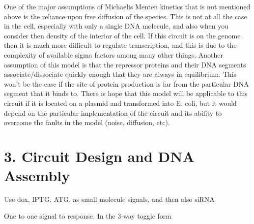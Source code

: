 \documentclass[11pt]{article}
\begin{document}
\begin{itemize}
One of the major assumptions of Michaelis Menten kinetics that is not mentioned above is the reliance upon free diffusion of the species. This is not at all the case in the cell, especially with only a single DNA molecule, and also when you consider then density of the interior of the cell.  If this circuit is on the genome then it is much more difficult to regulate transcription, and this is due to the complexity of available sigma factors among many other things. Another assumption of this model is that the repressor proteins and their DNA segments associate/dissociate quickly enough that they are always in equilibrium. This won't be the case if the site of protein production is far from the particular DNA segment that it binds to. There is hope that this model will be applicable to this circuit if it is located on a plasmid and transformed into E. coli, but it would depend on the particular implementation of the circuit and its ability to overcome the faults in the model (noise, diffusion, etc). 
\end{itemize}


\section*{3. Circuit Design and DNA Assembly}

Use dox, IPTG, ATG, as small molecule signals, and then also siRNA

One to one signal to response. In the 3-way toggle form
\end{document}
